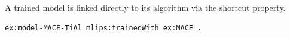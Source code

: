 A trained model is linked directly to its algorithm via the shortcut property.
\begin{lstlisting}[language=turtle]
ex:model-MACE-TiAl mlips:trainedWith ex:MACE .
\end{lstlisting}
